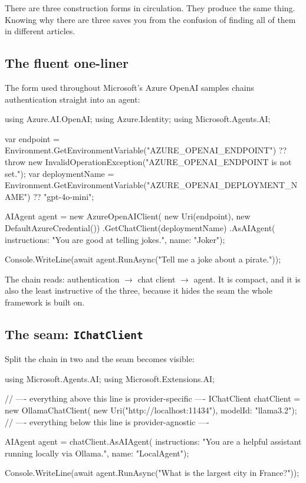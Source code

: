 There are three construction forms in circulation. They produce the same thing.
Knowing why there are three saves you from the confusion of finding all of them
in different articles.

\subsection{The fluent one-liner}

The form used throughout Microsoft's Azure OpenAI samples chains authentication
straight into an agent:

\begin{csharp}[caption={The canonical Azure OpenAI agent}, label={lst:azure-agent}]
using Azure.AI.OpenAI;
using Azure.Identity;
using Microsoft.Agents.AI;

var endpoint = Environment.GetEnvironmentVariable("AZURE_OPENAI_ENDPOINT")
    ?? throw new InvalidOperationException("AZURE_OPENAI_ENDPOINT is not set.");
var deploymentName = Environment.GetEnvironmentVariable("AZURE_OPENAI_DEPLOYMENT_NAME")
    ?? "gpt-4o-mini";

AIAgent agent = new AzureOpenAIClient(
        new Uri(endpoint),
        new DefaultAzureCredential())
    .GetChatClient(deploymentName)
    .AsAIAgent(
        instructions: "You are good at telling jokes.",
        name: "Joker");

Console.WriteLine(await agent.RunAsync("Tell me a joke about a pirate."));
\end{csharp}

The chain reads: authentication $\rightarrow$ chat client $\rightarrow$ agent. It
is compact, and it is also the least instructive of the three, because it hides
the seam the whole framework is built on.

\subsection{The seam: \texorpdfstring{\texttt{IChatClient}}{IChatClient}}
\label{sec:seam}

Split the chain in two and the seam becomes visible:

\begin{csharp}[caption={Provider-specific above the line, provider-agnostic below}, label={lst:seam}]
using Microsoft.Agents.AI;
using Microsoft.Extensions.AI;

// ---- everything above this line is provider-specific ----
IChatClient chatClient = new OllamaChatClient(
    new Uri("http://localhost:11434"),
    modelId: "llama3.2");
// ---- everything below this line is provider-agnostic ----

AIAgent agent = chatClient.AsAIAgent(
    instructions: "You are a helpful assistant running locally via Ollama.",
    name: "LocalAgent");

Console.WriteLine(await agent.RunAsync("What is the largest city in France?"));
\end{csharp}

